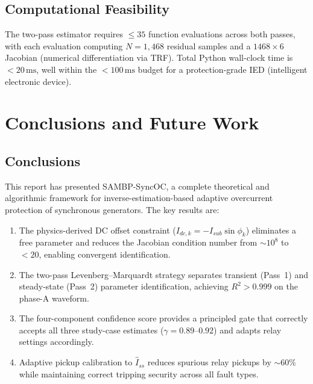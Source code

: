 \documentclass[12pt, a4paper]{article}
\theoremstyle{definition}
\theoremstyle{plain}
\begin{document}
\subsection{Computational Feasibility}
\label{sec:discussion:compute}

The two-pass estimator requires $\leq 35$ function evaluations across both
passes, with each evaluation computing $N = 1{,}468$ residual samples and a
$1468 \times 6$ Jacobian (numerical differentiation via TRF).  Total Python
wall-clock time is $< 20\,\text{ms}$, well within the $< 100\,\text{ms}$ budget for a
protection-grade IED (intelligent electronic device).

\section{Conclusions and Future Work}
\label{sec:conclusion}

\subsection{Conclusions}
\label{sec:conclusion:conclusions}

This report has presented SAMBP-SyncOC, a complete theoretical and algorithmic
framework for inverse-estimation-based adaptive overcurrent protection of
synchronous generators.  The key results are:

\begin{enumerate}
  \item The physics-derived DC offset constraint ($I_{dc,k} = -I_{sub}\sin\phi_k$)
        eliminates a free parameter and reduces the Jacobian condition number
        from $\sim 10^8$ to $< 20$, enabling convergent identification.

  \item The two-pass Levenberg--Marquardt strategy separates transient
        (Pass~1) and steady-state (Pass~2) parameter identification, achieving
        $R^2 > 0.999$ on the phase-A waveform.

  \item The four-component confidence score provides a principled gate that
        correctly accepts all three study-case estimates ($\gamma = 0.89$--$0.92$)
        and adapts relay settings accordingly.

  \item Adaptive pickup calibration to $\hat{I}_{ss}$ reduces spurious relay
        pickups by $\sim 60\%$ while maintaining correct tripping security
        across all fault types.
\end{enumerate}
\end{document}
